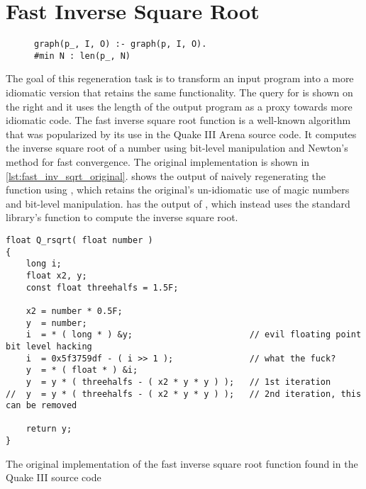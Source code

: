 \section{Fast Inverse Square Root}
\begin{wrapfigure}[3]{r}{0.5\textwidth}
\begin{verbatim}
graph(p_, I, O) :- graph(p, I, O).
#min N : len(p_, N)
\end{verbatim}
\end{wrapfigure}
The goal of this regeneration task is to transform an input 
program into a more idiomatic version that retains the same functionality.
The query for \sys is shown on the right and it uses the length of the output program as a proxy towards 
more idiomatic code.
The fast inverse square root function is a well-known algorithm that was
popularized by its use in the Quake III Arena source code.
It computes the inverse square root of a number using bit-level manipulation and
Newton's method for fast convergence.
The original implementation is shown in \cref{lst:fast_inv_sqrt_original}.
 shows the output of naively regenerating the function using \gptmodel,
which retains the original's un-idiomatic use of magic numbers and bit-level manipulation.
 has the output of \sys, which instead uses the standard library's
 function to compute the inverse square root.

\begin{listing}[h]
\begin{verbatim}
float Q_rsqrt( float number )
{
	long i;
	float x2, y;
	const float threehalfs = 1.5F;

	x2 = number * 0.5F;
	y  = number;
	i  = * ( long * ) &y;                       // evil floating point bit level hacking
	i  = 0x5f3759df - ( i >> 1 );               // what the fuck?
	y  = * ( float * ) &i;
	y  = y * ( threehalfs - ( x2 * y * y ) );   // 1st iteration
//	y  = y * ( threehalfs - ( x2 * y * y ) );   // 2nd iteration, this can be removed

	return y;
}
\end{verbatim}
  \caption{The original implementation of the fast inverse square root function 
  found in the Quake III source code~\cite{fast_inv_sqrt}}
  \label{lst:fast_inv_sqrt_original}
\end{listing}


